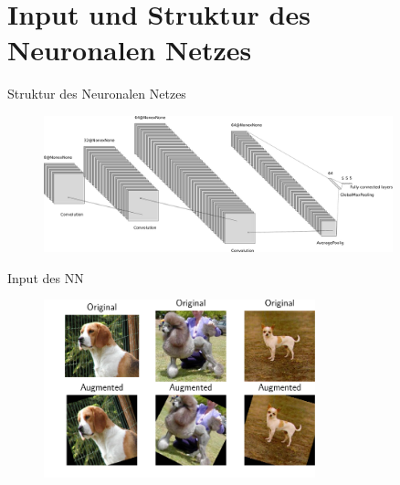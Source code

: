 


\maketitle
  \section{Input und Struktur des Neuronalen Netzes}
  \begin{frame}{Struktur des Neuronalen Netzes}
    \begin{figure}
      \centering
      \includegraphics[width=0.9\textwidth]{logos/nn.pdf}
      \label{fig:1}
    \end{figure}
  \end{frame}
  \begin{frame}{Input des NN}
    \begin{figure}
      \centering
      \includegraphics[width=0.7\textwidth]{logos/subplot.pdf}
      \label{fig:input}
    \end{figure}
  \end{frame}


